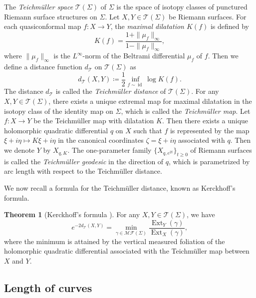 \documentclass[a4paper,11pt]{amsart}
\numberwithin{equation}{section}
\theoremstyle{definition}
\newtheorem{theorem}{Theorem}[section]
\DeclareMathOperator{\id}{id}
\newcommand{\Teich}{\mathcal{T}}
\DeclareMathOperator{\Ext}{Ext}
\begin{document}
The \textit{Teichmüller space} $\Teich(\Sigma)$ of $\Sigma$ is the space of isotopy classes of punctured Riemann surface structures on $\Sigma$.
Let $X, Y\in\Teich(\Sigma)$ be Riemann surfaces.
For each quasiconformal map $f\colon X\to Y$, the \textit{maximal dilatation $K(f)$} is defined by 
\begin{equation*}
    K(f)=\frac{1+\|\mu_f\|_\infty}{1-\|\mu_f\|_\infty},
\end{equation*}
where $\|\mu_f\|_\infty$ is the $L^\infty$-norm of the Beltrami differential $\mu_f$ of $f$.
Then we define a distance function $d_{\Teich}$ on $\Teich(\Sigma)$ as 
\begin{equation*}
    d_{\Teich}(X,Y)\coloneqq \frac12 \inf_{f\sim\id}\log K(f).
\end{equation*}
The distance $d_{\Teich}$ is called the \textit{Teichmüller distance} of $\Teich(\Sigma)$.
For any $X,Y\in \Teich(\Sigma)$, there exists a unique extremal map for maximal dilatation in the isotopy class of the identity map on $\Sigma$, which is called the \textit{Teichmüller map}.
Let $f \colon X \to Y$ be the Teichmüller map with dilatation $K$.
Then there exists a unique holomorphic quadratic differential $q$ on $X$ such that $f$ is represented by the map $\xi+i\eta \mapsto K\xi+i\eta$ in the canonical coordinates $\zeta = \xi+i\eta$ associated with $q$.
Then we denote $Y$ by $X_{q,K}$.
The one-parameter family $\{X_{q,e^{2t}}\}_{t \ge 0}$ of Riemann surfaces is called the \textit{Teichmüller geodesic} in the direction of $q$, which is parametrized by arc length with respect to the Teichmüller distance.

We now recall a formula for the Teichmüller distance, known as Kerckhoff's formula.

\begin{theorem}[Kerckhoff's formula \cite{kerckhoff1980asymptotic}]\label{theorem:KerckhoffFormula}
For any $X, Y \in \Teich(\Sigma)$, we have
\[
e^{-2 d_{\Teich}(X,Y)}
= \min_{\gamma \in \mathcal{MF}(\Sigma)}
\frac{\Ext_Y(\gamma)}{\Ext_X(\gamma)},
\]
where the minimum is attained by the vertical measured foliation of the holomorphic
quadratic differential associated with the Teichmüller map between $X$ and $Y$.
\end{theorem}



\subsection{Length of curves}
\end{document}
